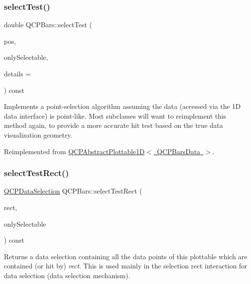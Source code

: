 \subsubsection{\texorpdfstring{select\+Test()}{selectTest()}}
{\footnotesize\ttfamily double Q\+C\+P\+Bars\+::select\+Test (\begin{DoxyParamCaption}\item[{const Q\+PointF \&}]{pos,  }\item[{bool}]{only\+Selectable,  }\item[{Q\+Variant $\ast$}]{details = {} }\end{DoxyParamCaption}) const\hspace{0.3cm}{\ttfamily [virtual]}}

Implements a point-\/selection algorithm assuming the data (accessed via the 1D data interface) is point-\/like. Most subclasses will want to reimplement this method again, to provide a more accurate hit test based on the true data visualization geometry.

Reimplemented from \mbox{\hyperlink{class_q_c_p_abstract_plottable1_d_a071e2df66ba1746067dfcb5e27947b43}{Q\+C\+P\+Abstract\+Plottable1\+D$<$ Q\+C\+P\+Bars\+Data $>$}}.

\mbox{\label{class_q_c_p_bars_ab03bb6125c3e983b89d694f75ce6b3d5}} 
\subsubsection{\texorpdfstring{select\+Test\+Rect()}{selectTestRect()}}
{\footnotesize\ttfamily \mbox{\hyperlink{class_q_c_p_data_selection}{Q\+C\+P\+Data\+Selection}} Q\+C\+P\+Bars\+::select\+Test\+Rect (\begin{DoxyParamCaption}\item[{const Q\+RectF \&}]{rect,  }\item[{bool}]{only\+Selectable }\end{DoxyParamCaption}) const\hspace{0.3cm}{\ttfamily [virtual]}}





Returns a data selection containing all the data points of this plottable which are contained (or hit by) {\itshape rect}. This is used mainly in the selection rect interaction for data selection (data selection mechanism).

